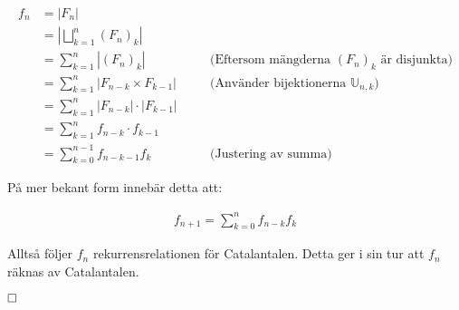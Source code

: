 \documentclass{tufte-handout}
\begin{document}
\begin{ans}
    \vspace{-4mm}

    \begin{align*}
        f_n &= |F_n| \\
        &= |\bigsqcup_{k = 1}^{n} (F_n)_k| \\
        &= \sum_{k=1}^{n} |(F_n)_k| &&\quad \text{(Eftersom mängderna $(F_n)_k$ är disjunkta)} \\
        &= \sum_{k=1}^{n} |F_{n-k} \times F_{k-1}| &&\quad \text{(Använder bijektionerna $\mathbb{U}_{n, k}$)} \\
        &= \sum_{k=1}^{n} |F_{n-k}| \cdot |F_{k-1}| \\
        &= \sum_{k=1}^{n} f_{n-k} \cdot f_{k-1} \\
        &= \sum_{k=0}^{n-1} f_{n-k-1} f_{k} &&\quad \text{(Justering av summa)}
    \end{align*}

    \vspace{3mm}
    
    På mer bekant form innebär detta att:

    \vspace{-4mm}

    \begin{align*}
        f_{n+1} = \sum_{k=0}^{n} f_{n-k} f_{k}
    \end{align*}

    Alltså följer $f_n$ rekurrensrelationen för Catalantalen. Detta ger i sin tur att $f_n$ räknas av Catalantalen.

    $\hfill \square$
\end{ans}
\end{document}
